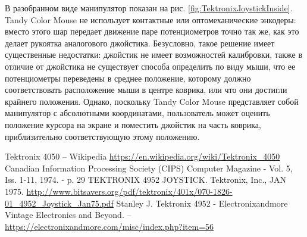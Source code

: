 \documentclass[11pt, a4paper]{article}
\begin{document}
В разобранном виде манипулятор показан на рис. \ref{fig:TektronixJoystickInside}. Tandy Color Mouse не использует контактные или оптомеханические энкодеры: вместо этого шар передает движение паре потенциометров точно так же, как это делает рукоятка аналогового джойстика. Безусловно, такое решение имеет существенные недостатки: джойстик не имеет возможностей калибровки, также в отличие от джойстика не существует способа определить по виду мыши, что ее потенциометры переведены в среднее положение, которому должно соответствовать расположение мыши в центре коврика, или что они достигли крайнего положения. Однако, поскольку Tandy Color Mouse представляет собой манипулятор с абсолютными координатами, пользователь может оценить положение курсора на экране и поместить джойстик на часть коврика, приблизительно соответствующую этому положению.

\begin{thebibliography}{9}
 Tektronix 4050 -- Wikipedia \url{https://en.wikipedia.org/wiki/Tektronix_4050}
 Canadian Information Processing Society (CIPS) Computer Magazine - Vol. 5, Iss. 1-11, 1974. - p. 29
 TEKTRONIX 4952 JOYSTICK. Tektronix, Inc., JAN 1975. \url{http://www.bitsavers.org/pdf/tektronix/401x/070-1826-01_4952_Joystick_Jan75.pdf}
 Stanley J. Tektronix 4952 - Electronixandmore Vintage Electronics and Beyond. -- \url{https://electronixandmore.com/misc/index.php?item=56}

\end{thebibliography}
\end{document}
